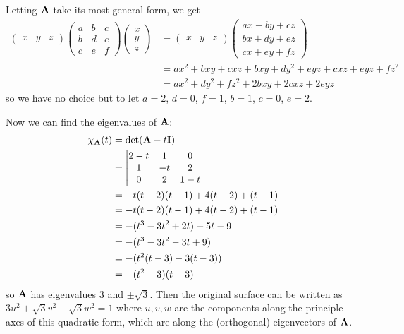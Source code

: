 \documentclass[fleqn,a4paper,11pt]{article}
\begin{document}
\begin{enumerate}[label=\textbf{\arabic*.}]
  Letting \(\mathbf{A}\) take its most general form, we get
  \begin{align*}
   \begin{pmatrix} x & y & z \end{pmatrix}
   \begin{pmatrix}
    a & b & c \\
    b & d & e \\
    c & e & f
   \end{pmatrix}
   \begin{pmatrix} x \\ y \\ z \end{pmatrix}
   &=
   \begin{pmatrix} x & y & z \end{pmatrix}
   \begin{pmatrix}
    ax + by + cz \\
    bx + dy + ez \\
    cx + ey + fz
   \end{pmatrix} \\
   &= ax^2 + bxy + cxz + bxy + dy^2 + eyz + cxz + eyz + fz^2 \\
   &= ax^2 + dy^2 + fz^2 + 2bxy + 2cxz + 2eyz
  \end{align*}
  so we have no choice but to let
  \(a = 2\), \(d = 0\), \(f = 1\), \(b = 1\), \(c = 0\), \(e = 2\).

  Now we can find the eigenvalues of \(\mathbf{A}\):
  \begin{align*}
   \chi_{\mathbf{A}}(t)
   &= \det(\mathbf{A} - t\mathbf{I}) \\
   &=
   \begin{vmatrix}
    2 - t & 1 & 0 \\
    1 & -t & 2 \\
    0 & 2 & 1 - t
   \end{vmatrix} \\
   &= -t(t - 2)(t - 1) + 4(t - 2) + (t - 1) \\
   &= -t(t - 2)(t - 1) + 4(t - 2) + (t - 1) \\
   &= -(t^3 - 3t^2 + 2t) + 5t - 9 \\
   &= -(t^3 - 3t^2 - 3t + 9) \\
   &= -(t^2(t - 3) - 3(t - 3)) \\
   &= -(t^2 - 3)(t - 3)
  \end{align*}
  so \(\mathbf{A}\) has eigenvalues \(3\) and \(\pm \sqrt 3\). Then the original
  surface can be written as
  \(3u^2 + \sqrt 3 v^2 - \sqrt 3 w^2 = 1\) where \(u, v, w\) are the components
  along the principle axes of this quadratic form, which are along the
  (orthogonal) eigenvectors of \(\mathbf{A}\).


\end{enumerate}
\end{document}
